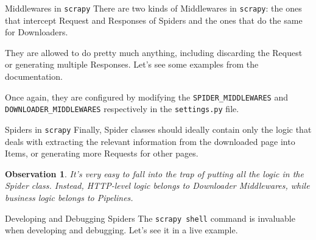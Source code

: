 \documentclass[12pt]{beamer}
\newtheorem{observation}{Observation}
\begin{document}
  \begin{frame}{Middlewares in \texttt{scrapy}}
    There are two kinds of Middlewares in \texttt{scrapy}: the ones that
    intercept Request and Responses of Spiders and the ones that do the same
    for Downloaders.

    \vspace{0.5cm}

    They are allowed to do pretty much anything, including discarding the
    Request or generating multiple Responses. Let's see some examples from the
    documentation.

    \vspace{0.5cm}

    Once again, they are configured by modifying the
    \texttt{SPIDER\_MIDDLEWARES} and \texttt{DOWNLOADER\_MIDDLEWARES}
    respectively in the \texttt{settings.py} file.
  \end{frame}

  \begin{frame}{Spiders in \texttt{scrapy}}
    Finally, Spider classes should ideally contain only the logic that deals
    with extracting the relevant information from the downloaded page into
    Items, or generating more Requests for other pages.

    \vspace{0.5cm}

    \begin{observation}
      It's very easy to fall into the trap of putting all the logic in the
      Spider class. Instead, HTTP-level logic belongs to Downloader
      Middlewares, while business logic belongs to Pipelines.
    \end{observation}
  \end{frame}

  \begin{frame}{Developing and Debugging Spiders}
    The \texttt{scrapy shell} command is invaluable when developing and
    debugging.  Let's see it in a live example.
  \end{frame}
\end{document}
